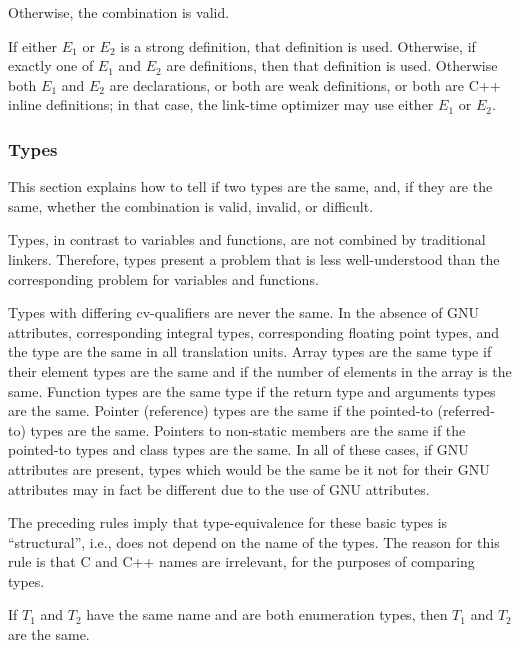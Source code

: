 Otherwise, the combination is valid.

If either $E_1$ or $E_2$ is a strong definition, that definition is
used.  Otherwise, if exactly one of $E_1$ and $E_2$ are definitions,
then that definition is used.  Otherwise both $E_1$ and $E_2$ are
declarations, or both are weak definitions, or both are C++ inline
definitions; in that case, the link-time optimizer may use either
$E_1$ or $E_2$.

\subsubsection{Types}
\label{sec:types}

This section explains how to tell if two types are the same, and, if
they are the same, whether the combination is valid, invalid, or
difficult.  

\begin{note}
  Types, in contrast to variables and functions, are not combined by
  traditional linkers.  Therefore, types present a problem that is
  less well-understood than the corresponding problem for variables
  and functions.
\end{note} 

Types with differing cv-qualifiers are never the same.  In the absence
of GNU attributes, corresponding integral types, corresponding
floating point types, and the  type are the same in all
translation units.  Array types are the same type if their element
types are the same and if the number of elements in the array is the
same.  Function types are the same type if the return type and
arguments types are the same.  Pointer (reference) types are the same
if the pointed-to (referred-to) types are the same.  Pointers to
non-static members are the same if the pointed-to types and class
types are the same.  In all of these cases, if GNU attributes are
present, types which would be the same be it not for their GNU
attributes may in fact be different due to the use of GNU attributes.

\begin{note}
  The preceding rules imply that type-equivalence for these basic types
  is ``structural'', i.e., does not depend on the name of the
  types.  The reason for this rule is that C and C++ 
  names are irrelevant, for the purposes of comparing types.
\end{note}

If $T_1$ and $T_2$ have the same name and are both enumeration types,
then $T_1$ and $T_2$ are the same.

